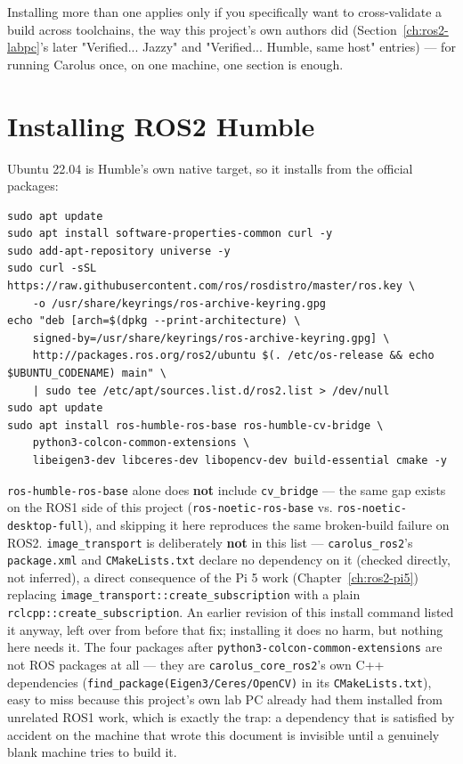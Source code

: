 \documentclass[11pt]{report}
\newenvironment{warningbox}%
  {\begin{lrbox}{\warnbox}\begin{minipage}{0.90\textwidth}}%
  {\end{minipage}\end{lrbox}%
   \begin{center}\fcolorbox{black}{codebg}{\usebox{\warnbox}}\end{center}}
\begin{document}
Installing more than one applies only if you specifically want to
cross-validate a build across toolchains, the way this project's own
authors did (Section~\ref{ch:ros2-labpc}'s later "Verified... Jazzy" and
"Verified... Humble, same host" entries) --- for running Carolus once, on
one machine, one section is enough.

\section{Installing ROS2 Humble}

Ubuntu 22.04 is Humble's own native target, so it installs from the official
packages:

\begin{lstlisting}[style=shell]
sudo apt update
sudo apt install software-properties-common curl -y
sudo add-apt-repository universe -y
sudo curl -sSL https://raw.githubusercontent.com/ros/rosdistro/master/ros.key \
    -o /usr/share/keyrings/ros-archive-keyring.gpg
echo "deb [arch=$(dpkg --print-architecture) \
    signed-by=/usr/share/keyrings/ros-archive-keyring.gpg] \
    http://packages.ros.org/ros2/ubuntu $(. /etc/os-release && echo $UBUNTU_CODENAME) main" \
    | sudo tee /etc/apt/sources.list.d/ros2.list > /dev/null
sudo apt update
sudo apt install ros-humble-ros-base ros-humble-cv-bridge \
    python3-colcon-common-extensions \
    libeigen3-dev libceres-dev libopencv-dev build-essential cmake -y
\end{lstlisting}

\begin{warningbox}
\texttt{ros-humble-ros-base} alone does \textbf{not} include
\texttt{cv\_bridge} --- the same gap exists on the ROS1 side of this project
(\texttt{ros-noetic-ros-base} vs. \texttt{ros-noetic-desktop-full}), and
skipping it here reproduces the same broken-build failure on ROS2.
\texttt{image\_transport} is deliberately \textbf{not} in this list ---
\texttt{carolus\_ros2}'s \texttt{package.xml} and \texttt{CMakeLists.txt}
declare no dependency on it (checked directly, not inferred), a direct
consequence of the Pi 5 work (Chapter~\ref{ch:ros2-pi5}) replacing
\texttt{image\_transport::create\_subscription} with a plain
\texttt{rclcpp::create\_subscription}. An earlier revision of this
install command listed it anyway, left over from before that fix; installing
it does no harm, but nothing here needs it. The four packages after
\texttt{python3-colcon-common-extensions} are not ROS packages at all ---
they are \texttt{carolus\_core\_ros2}'s own C++ dependencies
(\texttt{find\_package(Eigen3/Ceres/OpenCV)} in its \texttt{CMakeLists.txt}),
easy to miss because this project's own lab PC already had them installed
from unrelated ROS1 work, which is exactly the trap: a dependency that is
satisfied by accident on the machine that wrote this document is invisible
until a genuinely blank machine tries to build it.
\end{warningbox}
\end{document}
